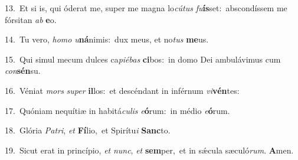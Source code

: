 {\numbfont\textcolor{\numbcolor}{13.}}~Et si is, qui óderat me, super me magna lo\-\textit{cú}\-\textit{tus} \textit{fu}\-\textbf{ís}set:~\star abscondíssem me fórsitan \textit{ab} \textbf{e}\-o.\par
{\numbfont\textcolor{\numbcolor}{14.}}~Tu vero, \textit{ho}\-\textit{mo} \textit{u}\-\textbf{ná}nimis:~\star dux meus, et no\textit{tus} \textbf{me}\-us.\par
{\numbfont\textcolor{\numbcolor}{15.}}~Qui simul mecum dulces ca\-\textit{pi}\-\textit{é}\textit{bas} \textbf{ci}\-bos:~\star in domo Dei ambulávimus cum \textit{con}\-\textbf{sén}su.\par
{\numbfont\textcolor{\numbcolor}{16.}}~Véniat \textit{mors} \textit{su}\-\textit{per} \textbf{il}\-los:~\star et descéndant in inférnum \textit{vi}\-\textbf{vén}tes:\par
{\numbfont\textcolor{\numbcolor}{17.}}~Quóniam nequítiæ in habitá\-\textit{cu}\-\textit{lis} \textit{e}\-\textbf{ó}rum:~\star in médio \textit{e}\-\textbf{ó}rum.\par
{\numbfont\textcolor{\numbcolor}{18.}}~Glória \textit{Pa}\-\textit{tri}, \textit{et} \textbf{Fí}\-lio,~\star et Spirítu\textit{i} \textbf{Sanc}\-to.\par
{\numbfont\textcolor{\numbcolor}{19.}}~Sicut erat in princípio, \textit{et} \textit{nunc}\-, \textit{et} \textbf{sem}\-per,~\star et in sǽcula sæculó\-\textit{rum}\-. \textbf{A}\-men.\par
